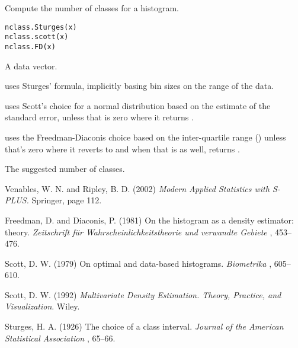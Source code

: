 %
\begin{Description}\relax
Compute the number of classes for a histogram.
\end{Description}
%
\begin{Usage}
\begin{verbatim}
nclass.Sturges(x)
nclass.scott(x)
nclass.FD(x)
\end{verbatim}
\end{Usage}
%
\begin{Arguments}
\begin{ldescription}
\item[\code{x}] 
A data vector.

\end{ldescription}
\end{Arguments}
%
\begin{Details}\relax
{} uses Sturges' formula, implicitly basing bin
sizes on the range of the data.

 uses Scott's choice for a normal distribution based on
the estimate of the standard error, unless that is zero where it
returns .

 uses the Freedman-Diaconis choice based on the
inter-quartile range () unless that's zero where it
reverts to  and when that is 
as well, returns .
\end{Details}
%
\begin{Value}
The suggested number of classes.
\end{Value}
%
\begin{References}\relax
Venables, W. N. and Ripley, B. D. (2002)
\emph{Modern Applied Statistics with S-PLUS.}
Springer, page 112.

Freedman, D. and Diaconis, P. (1981)
On the histogram as a density estimator:  theory.
\emph{Zeitschrift für Wahrscheinlichkeitstheorie
und verwandte Gebiete} , 453--476.

Scott, D. W. (1979) On optimal and data-based histograms.
\emph{Biometrika} , 605--610.

Scott, D. W. (1992)
\emph{Multivariate Density Estimation. Theory, Practice, and
Visualization}. Wiley.

Sturges, H. A. (1926)  The choice of a class interval.
\emph{Journal of the American Statistical Association} , 65--66.
\end{References}
